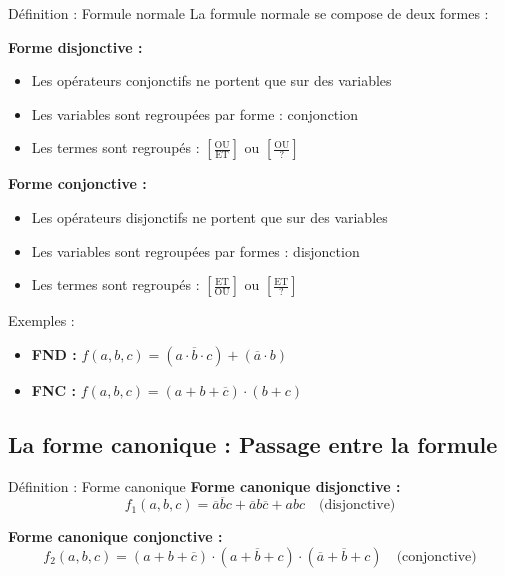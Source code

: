 \documentclass[a4paper,12pt]{article}
\begin{document}
\begin{defbox}{Définition : Formule normale}
La formule normale se compose de deux formes :

\textbf{Forme disjonctive :}
\begin{itemize}
    \item Les opérateurs conjonctifs ne portent que sur des variables
    \item Les variables sont regroupées par forme : conjonction
    \item Les termes sont regroupés : $\left[\frac{\text{OU}}{\text{ET}}\right]$ ou $\left[\frac{\text{OU}}{?}\right]$
\end{itemize}

\textbf{Forme conjonctive :}
\begin{itemize}
    \item Les opérateurs disjonctifs ne portent que sur des variables
    \item Les variables sont regroupées par formes : disjonction
    \item Les termes sont regroupés : $\left[\frac{\text{ET}}{\text{OU}}\right]$ ou $\left[\frac{\text{ET}}{?}\right]$
\end{itemize}

\vspace{0.3cm}
Exemples :
\begin{itemize}
    \item \textbf{FND :} $f(a,b,c) = (a \cdot \overline{b} \cdot c) + (\overline{a} \cdot b)$
    \item \textbf{FNC :} $f(a,b,c) = (a + b + \overline{c}) \cdot (b + c)$
\end{itemize}
\end{defbox}

\subsection{La forme canonique : Passage entre la formule}

\begin{defbox}{Définition : Forme canonique}
\textbf{Forme canonique disjonctive :}
\[f_1(a,b,c) = \overline{a}\overline{b}c + \overline{a}b\overline{c} + abc \quad \text{(disjonctive)}\]

\textbf{Forme canonique conjonctive :}
\[f_2(a,b,c) = (a+b+\overline{c}) \cdot (a+\overline{b}+c) \cdot (\overline{a}+\overline{b}+c) \quad \text{(conjonctive)}\]
\end{defbox}
\end{document}
